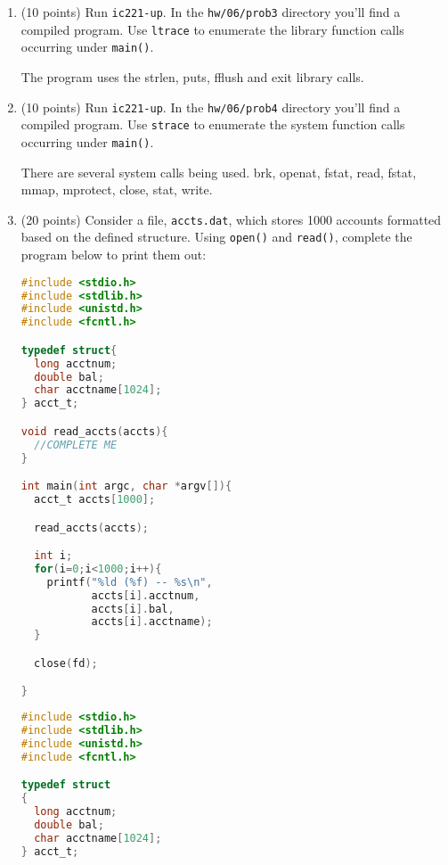 \documentclass{article}[9pt]
\newenvironment{answerfont}{\fontfamily{qhv}\selectfont}{\par}
\newenvironment{myanswer}{\begin{mdframed}\begin{answerfont}}{\end{answerfont}\end{mdframed}}
\begin{document}
\begin{enumerate}
\item (10 points) Run \texttt{ic221-up}. In the \texttt{hw/06/prob3} directory you'll find a compiled
program. Use \texttt{ltrace} to enumerate the library function calls
occurring under \texttt{main()}.

\begin{myanswer}
The program uses the strlen, puts, fflush and exit library calls.
\end{myanswer}

\item (10 points) Run \texttt{ic221-up}. In the \texttt{hw/06/prob4} directory you'll find a compiled
program. Use \texttt{strace} to enumerate the system function calls
occurring under \texttt{main()}.

\begin{myanswer}
There are several system calls being used. brk, openat, fstat, read, fstat, mmap, mprotect, close, stat, write.
\end{myanswer}

\item (20 points) Consider a file, \texttt{accts.dat}, which stores 1000 accounts
formatted based on the defined structure. Using \texttt{open()} and
\texttt{read()}, complete the program below to print them out:


\begin{lstlisting}[language=c]
#include <stdio.h>
#include <stdlib.h>
#include <unistd.h>
#include <fcntl.h>

typedef struct{
  long acctnum;
  double bal;
  char acctname[1024];
} acct_t;

void read_accts(accts){
  //COMPLETE ME
}

int main(int argc, char *argv[]){
  acct_t accts[1000];

  read_accts(accts);

  int i;
  for(i=0;i<1000;i++){
    printf("%ld (%f) -- %s\n",
           accts[i].acctnum,
           accts[i].bal,
           accts[i].acctname);
  }

  close(fd);

}
\end{lstlisting}

\begin{myanswer}
\begin{lstlisting}[language=c]
#include <stdio.h>
#include <stdlib.h>
#include <unistd.h>
#include <fcntl.h>

typedef struct
{
  long acctnum;
  double bal;
  char acctname[1024];
} acct_t;


\end{lstlisting}
\end{myanswer}
\end{enumerate}
\end{document}
